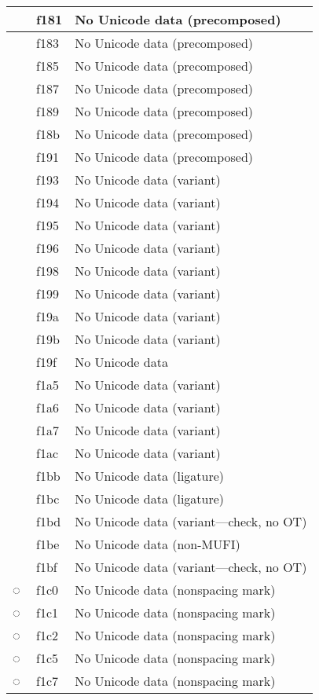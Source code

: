 \documentclass[12pt,letterpaper,openany]{book}
\begin{document}
\begin{center}
\begin{supertabular}{|m{0.25in}|m{0.5in}|m{4in}|}
 & f181 & No Unicode data (precomposed)\\\hline
 & f183 & No Unicode data (precomposed)\\\hline
 & f185 & No Unicode data (precomposed)\\\hline
 & f187 & No Unicode data (precomposed)\\\hline
 & f189 & No Unicode data (precomposed)\\\hline
 & f18b & No Unicode data (precomposed)\\\hline
 & f191 & No Unicode data (precomposed)\\\hline
 & f193 & No Unicode data (variant)\\\hline
 & f194 & No Unicode data (variant)\\\hline
 & f195 & No Unicode data (variant)\\\hline
 & f196 & No Unicode data (variant)\\\hline
 & f198 & No Unicode data (variant)\\\hline
 & f199 & No Unicode data (variant)\\\hline
 & f19a & No Unicode data (variant)\\\hline
 & f19b & No Unicode data (variant)\\\hline
 & f19f & No Unicode data\\\hline
 & f1a5 & No Unicode data (variant)\\\hline
 & f1a6 & No Unicode data (variant)\\\hline
 & f1a7 & No Unicode data (variant)\\\hline
 & f1ac & No Unicode data (variant)\\\hline
 & f1bb & No Unicode data (ligature)\\\hline
 & f1bc & No Unicode data (ligature)\\\hline
 & f1bd & No Unicode data (variant---check, no OT)\\\hline
 & f1be & No Unicode data (non-MUFI)\\\hline
 & f1bf & No Unicode data (variant---check, no OT)\\\hline
◌ & f1c0 & No Unicode data (nonspacing mark)\\\hline
◌ & f1c1 & No Unicode data (nonspacing mark)\\\hline
◌ & f1c2 & No Unicode data (nonspacing mark)\\\hline
◌ & f1c5 & No Unicode data (nonspacing mark)\\\hline
◌ & f1c7 & No Unicode data (nonspacing mark)\\\hline

\end{supertabular}
\end{center}
\end{document}
